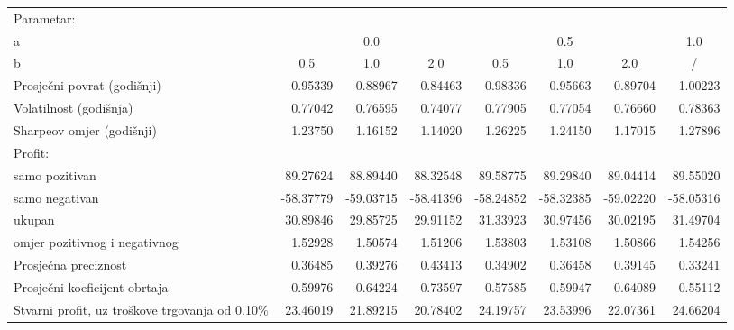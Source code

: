 \begin{sidewaystable}[bt]
  \centering
  \label{table:results-1}
  \begin{tabularx}{\hsize}{Xrrrrrrr}
    \toprule
    Parametar: & & & & & & & \\
    \quad a & \multicolumn{3}{c}{0.0} & \multicolumn{3}{c}{0.5} & \multicolumn{1}{c}{1.0} \\ \cmidrule(lr){2-4} \cmidrule(lr){5-7} \cmidrule(lr){8-8}
    \quad b & \multicolumn{1}{c}{0.5} & \multicolumn{1}{c}{1.0} & \multicolumn{1}{c}{2.0} & \multicolumn{1}{c}{0.5} & \multicolumn{1}{c}{1.0} & \multicolumn{1}{c}{2.0} & \multicolumn{1}{c}{/} \\ \midrule
    Prosječni povrat (godišnji) & 0.95339 & 0.88967 & 0.84463 & 0.98336 & 0.95663 & 0.89704 & 1.00223 \\
    Volatilnost (godišnja) & 0.77042 & 0.76595 & 0.74077 & 0.77905 & 0.77054 & 0.76660 & 0.78363 \\
    Sharpeov omjer (godišnji) & 1.23750 & 1.16152 & 1.14020 & 1.26225 & 1.24150 & 1.17015 & 1.27896 \\ \midrule
    Profit: &  &  &  &  &  &  &  \\
    \quad samo pozitivan & 89.27624 & 88.89440 & 88.32548 & 89.58775 & 89.29840 & 89.04414 & 89.55020 \\
    \quad samo negativan & -58.37779 & -59.03715 & -58.41396 & -58.24852 & -58.32385 & -59.02220 & -58.05316 \\
    \quad ukupan & 30.89846 & 29.85725 & 29.91152 & 31.33923 & 30.97456 & 30.02195 & 31.49704 \\
    \quad omjer pozitivnog i negativnog & 1.52928 & 1.50574 & 1.51206 & 1.53803 & 1.53108 & 1.50866 & 1.54256 \\ \midrule
    Prosječna preciznost & 0.36485 & 0.39276 & 0.43413 & 0.34902 & 0.36458 & 0.39145 & 0.33241 \\
    Prosječni koeficijent obrtaja & 0.59976 & 0.64224 & 0.73597 & 0.57585 & 0.59947 & 0.64089 & 0.55112 \\ \midrule
    Stvarni profit, uz troškove trgovanja od 0.10\% & 23.46019 & 21.89215 & 20.78402 & 24.19757 & 23.53996 & 22.07361 & 24.66204 \\ \bottomrule
  \end{tabularx}
\end{sidewaystable}
